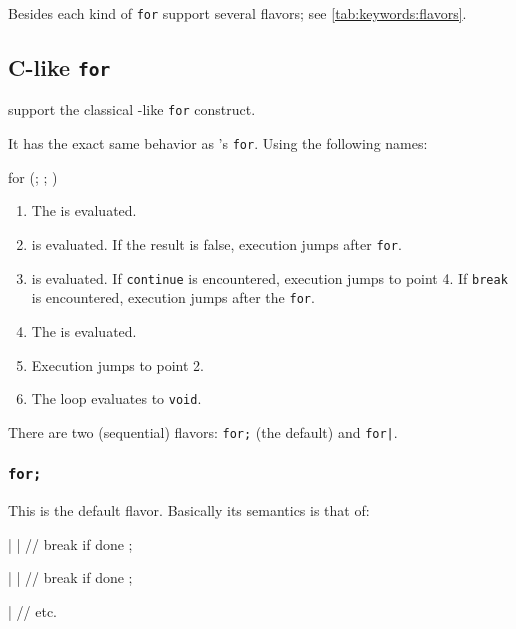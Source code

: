 Besides each kind of \lstinline{for} support several flavors; see
\autoref{tab:keywords:flavors}.

\subsection{C-like \lstinline{for}}
\label{sec:lang:forc}

\us support the classical \langC-like \lstinline{for} construct.



It has the exact same behavior as \langC's \lstinline{for}.  Using the
following names:

\begin{urbiunchecked}
for (; ; )
\end{urbiunchecked}

\begin{enumerate}
\item The  is evaluated.
\item {} is evaluated. If the result is false, execution
  jumps after \lstinline{for}.
\item {} is evaluated. If \lstinline{continue} is encountered,
  execution jumps to point 4. If \lstinline{break} is encountered,
  execution jumps after the \lstinline{for}.
\item The  is evaluated.
\item Execution jumps to point 2.
\item The loop evaluates to \lstinline{void}.
\end{enumerate}

There are two (sequential) flavors: \lstinline{for;} (the default) and
\lstinline{for|}.

\subsubsection{\lstinline{for;}}
\label{sec:lang:forc:semi}
This is the default flavor.  Basically its semantics is that of:

\begin{urbiunchecked}
|
|      // break if done
;

|
|      // break if done
;

|
// etc.
\end{urbiunchecked}

